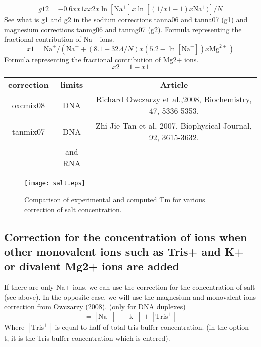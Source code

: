 \documentclass{article}
\begin{document}
\begin{itemize}
\begin{itemize}
\begin{displaymath}
  g12 = -0.6 x x1 x x2 x \ln [\mbox{Na}^+] x \ln [(1 / x1 - 1) x \mbox{Na}^+)] / N  
 \end{displaymath}
  See what is g1 and g2 in the sodium corrections tanna06 and tanna07 (g1) and
  magnesium corrections tanmg06 and tanmg07 (g2).
  Formula representing the fractional contribution of Na+ ions.
 \begin{displaymath}
  x1 = \mbox{Na}^+ / (\mbox{Na}^+ + (8.1 - 32.4 / N) x (5.2 - \ln [\mbox{Na}^+]) x \mbox{Mg}^{2+})  
 \end{displaymath}
 Formula representing the fractional contribution of Mg2+ ions.
 \begin{displaymath}
  x2= 1-x1  
 \end{displaymath}
 \end{itemize}
\end{itemize}

\begin{table}[h]
\begin{tabular}[h]{| c | c | c |}
\textbf{correction} & \textbf{limits} & \textbf{Article} \\ 
oxcmix08 & DNA & Richard Owczarzy et al.,2008, Biochemistry, 47, 5336-5353. \\
tanmix07 & DNA & Zhi-Jie Tan et al, 2007, Biophysical Journal, 92, 3615-3632.\\
& and RNA &  \\
\end{tabular}
\end{table}
   
\begin{figure}[h]
\texttt{[image: salt.eps]}
\caption{Comparison of experimental and computed Tm for various correction
of salt concentration.}
\end{figure}

\subsection{Correction for the concentration of ions when other monovalent ions such as 
Tris+ and K+ or divalent Mg2+ ions are added}  

If there are only Na+ ions, we can use the correction for the concentration of salt
(see above). In the opposite case, we will use the magnesium and monovalent ions correction
from Owczarzy (2008). (only for DNA duplexes)
\begin{displaymath}
 [\mbox{Mon}^+] = [\mbox{Na}^+] + [\mbox{k}^+] + [\mbox{Tris}^+]
\end{displaymath}
  Where $[\mbox{Tris}^+]$ is equal to half of total tris buffer concentration. (in the option -t, it is the Tris buffer concentration
which is entered).
\end{document}
